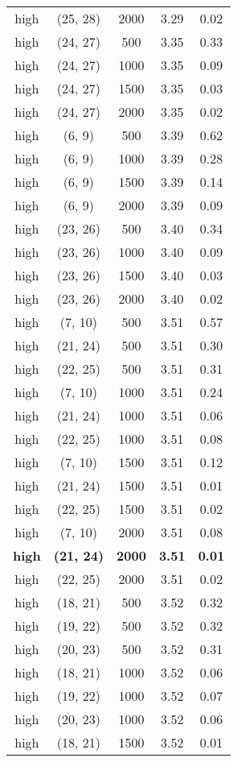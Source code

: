 \begin{tabular}{c c c c c}
high & (25, 28) &  2000 & 3.29 & 0.02 \\
high & (24, 27) &  500 & 3.35 & 0.33 \\
high & (24, 27) &  1000 & 3.35 & 0.09 \\
high & (24, 27) &  1500 & 3.35 & 0.03 \\
high & (24, 27) &  2000 & 3.35 & 0.02 \\
high & (6, 9) &  500 & 3.39 & 0.62 \\
high & (6, 9) &  1000 & 3.39 & 0.28 \\
high & (6, 9) &  1500 & 3.39 & 0.14 \\
high & (6, 9) &  2000 & 3.39 & 0.09 \\
high & (23, 26) &  500 & 3.40 & 0.34 \\
high & (23, 26) &  1000 & 3.40 & 0.09 \\
high & (23, 26) &  1500 & 3.40 & 0.03 \\
high & (23, 26) &  2000 & 3.40 & 0.02 \\
high & (7, 10) &  500 & 3.51 & 0.57 \\
high & (21, 24) &  500 & 3.51 & 0.30 \\
high & (22, 25) &  500 & 3.51 & 0.31 \\
high & (7, 10) &  1000 & 3.51 & 0.24 \\
high & (21, 24) &  1000 & 3.51 & 0.06 \\
high & (22, 25) &  1000 & 3.51 & 0.08 \\
high & (7, 10) &  1500 & 3.51 & 0.12 \\
high & (21, 24) &  1500 & 3.51 & 0.01 \\
high & (22, 25) &  1500 & 3.51 & 0.02 \\
high & (7, 10) &  2000 & 3.51 & 0.08 \\
\textbf{high} & \textbf{(21, 24)} & \textbf{ 2000} & \textbf{3.51} & \textbf{0.01} \\
high & (22, 25) &  2000 & 3.51 & 0.02 \\
high & (18, 21) &  500 & 3.52 & 0.32 \\
high & (19, 22) &  500 & 3.52 & 0.32 \\
high & (20, 23) &  500 & 3.52 & 0.31 \\
high & (18, 21) &  1000 & 3.52 & 0.06 \\
high & (19, 22) &  1000 & 3.52 & 0.07 \\
high & (20, 23) &  1000 & 3.52 & 0.06 \\
high & (18, 21) &  1500 & 3.52 & 0.01 \\

\end{tabular}
